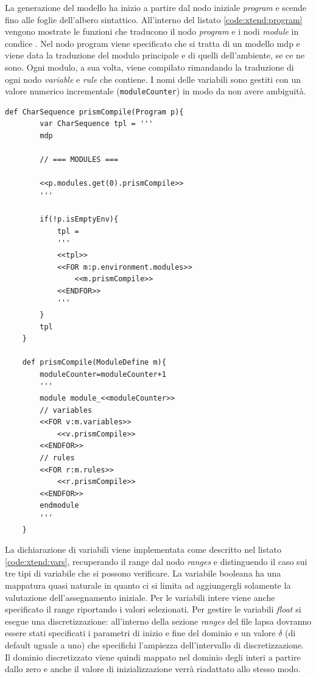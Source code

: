 La generazione del modello \prism{} ha inizio a partire dal nodo iniziale \emph{program} e scende fino alle foglie dell'albero sintattico. All'interno del listato \ref{code:xtend:program} vengono mostrate le funzioni che traducono il nodo \emph{program} e i nodi \emph{module} in condice \prism{}. Nel nodo program viene specificato che si tratta di un modello \ac{mdp} e viene data la traduzione del modulo principale e di quelli dell'ambiente, se ce ne sono. Ogni modulo, a sua volta, viene compilato rimandando la traduzione di ogni nodo \emph{variable} e \emph{rule} che contiene. I nomi delle variabili sono gestiti con un valore numerico incrementale (\texttt{moduleCounter}) in modo da non avere ambiguità.

\begin{lstlisting}[language=xtend,style=eclipse,caption={Implementazione della funzione di generazione in \xtend{}},label=code:xtend:program]
	def CharSequence prismCompile(Program p){
		var CharSequence tpl = '''
		mdp
		
		// === MODULES ===
		
		<<p.modules.get(0).prismCompile>>
		'''
		
		if(!p.isEmptyEnv){
			tpl = 
			'''
			<<tpl>>
			<<FOR m:p.environment.modules>>
				<<m.prismCompile>>
			<<ENDFOR>>
			'''
		}
		tpl
	}
		
	def prismCompile(ModuleDefine m){
		moduleCounter=moduleCounter+1
		'''
		module module_<<moduleCounter>>
		// variables
		<<FOR v:m.variables>>
			<<v.prismCompile>>
		<<ENDFOR>>
		// rules
		<<FOR r:m.rules>>
			<<r.prismCompile>>
		<<ENDFOR>>
		endmodule
		'''
	}
\end{lstlisting}

La dichiarazione di variabili viene implementata come descritto nel listato \ref{code:xtend:vars}, recuperando il range dal nodo \emph{ranges} e distinguendo il caso sui tre tipi di variabile che si possono verificare. La variabile booleana ha una mappatura quasi naturale in quanto ci si limita ad aggiungergli solamente la valutazione dell'assegnamento iniziale. Per le variabili intere viene anche specificato il range riportando i valori selezionati. Per gestire le variabili \emph{float} si esegue una discretizzazione: all'interno della sezione \emph{ranges} del file \ac{lapsa} dovranno essere stati specificati i parametri di inizio e fine del dominio e un valore $\delta$ (di default uguale a uno) che specifichi l'ampiezza dell'intervallo di discretizzazione. Il dominio discretizzato viene quindi mappato nel dominio degli interi a partire dallo zero e anche il valore di inizializzazione verrà riadattato allo stesso modo.

